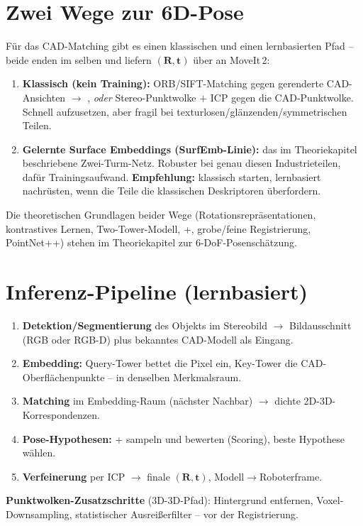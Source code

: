 \section{Zwei Wege zur 6D-Pose}
Für das CAD-Matching gibt es einen klassischen und einen lernbasierten Pfad --
beide enden im selben  und liefern $(\bm{R},\bm{t})$ über
 an MoveIt\,2:
\begin{enumerate}
\item \textbf{Klassisch (kein Training):} ORB/SIFT-Matching gegen gerenderte
  CAD-Ansichten $\rightarrow$ , \emph{oder} Stereo-Punktwolke
  $+$ ICP gegen die CAD-Punktwolke. Schnell aufzusetzen, aber fragil bei
  texturlosen/glänzenden/symmetrischen Teilen.
\item \textbf{Gelernte Surface Embeddings (SurfEmb-Linie):} das im Theoriekapitel
  beschriebene Zwei-Turm-Netz. Robuster bei genau diesen Industrieteilen, dafür
  Trainingsaufwand. \textbf{Empfehlung:} klassisch starten, lernbasiert
  nachrüsten, wenn die Teile die klassischen Deskriptoren überfordern.
\end{enumerate}
Die theoretischen Grundlagen beider Wege (Rotationsrepräsentationen, kontrastives
Lernen, Two-Tower-Modell, +, grobe/feine Registrierung,
PointNet++) stehen im Theoriekapitel zur 6-DoF-Posenschätzung.

\section{Inferenz-Pipeline (lernbasiert)}
\begin{enumerate}
\item \textbf{Detektion/Segmentierung} des Objekts im Stereobild $\rightarrow$
  Bildausschnitt (RGB oder RGB-D) plus bekanntes CAD-Modell als Eingang.
\item \textbf{Embedding:} Query-Tower bettet die Pixel ein, Key-Tower die
  CAD-Oberflächenpunkte -- in denselben Merkmalsraum.
\item \textbf{Matching} im Embedding-Raum (nächster Nachbar) $\rightarrow$ dichte
  2D-3D-Korrespondenzen.
\item \textbf{Pose-Hypothesen:} + sampeln und bewerten
  (Scoring), beste Hypothese wählen.
\item \textbf{Verfeinerung} per ICP $\rightarrow$ finale $(\bm{R},\bm{t})$,
  Modell$\rightarrow$Roboterframe.
\end{enumerate}

\noindent\textbf{Punktwolken-Zusatzschritte} (3D-3D-Pfad): Hintergrund entfernen,
Voxel-Downsampling, statistischer Ausreißerfilter -- vor der Registrierung.

